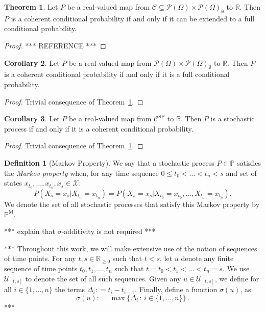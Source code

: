 \documentclass[10pt]{paper}
\theoremstyle{definition}
\newtheorem{theorem}{Theorem}
\newtheorem{corollary}[theorem]{Corollary}
\newtheorem{definition}{Definition}
\newcommand{\reals}{\mathbb{R}}
\newcommand{\realsnonneg}{\reals_{\geq 0}}
\newcommand{\states}{\mathcal{X}}
\newcommand{\paths}{\Omega}
\newcommand{\power}{\mathcal{P}(\paths)}
\newcommand{\nonemptypower}{\power_{\emptyset}}
\newcommand{\processes}{\mathbb{P}}
\newcommand{\mprocesses}{\processes^{\mathrm{M}}}
\newcommand{\coloneqq}{:\!=}
\begin{document}
\begin{theorem}\label{theo:coherentextendable}
Let $P$ be a real-valued map from $\mathcal{C}\subseteq\power\times\nonemptypower$ to $\reals$. Then $P$ is a coherent conditional probability if and only if it can be extended to a full conditional probability.
\end{theorem}
\begin{proof}
*** REFERENCE ***
\end{proof}

\begin{corollary}
Let $P$ be a real-valued map from $\power\times\nonemptypower$ to $\reals$. Then $P$ is a coherent conditional probability if and only if it is a full conditional probability.
\end{corollary}
\begin{proof}
Trivial consequence of Theorem~\ref{theo:coherentextendable}.
\end{proof}

\begin{corollary}
Let $P$ be a real-valued map from $\mathcal{C}^\mathrm{SP}$ to $\reals$. Then $P$ is a stochastic process if and only if it is a coherent conditional probability.
\end{corollary}
\begin{proof}
Trivial consequence of Theorem~\ref{theo:coherentextendable}.
\end{proof}


\begin{definition}[Markov Property]\label{def:markov_property}
We say that a stochastic process $P\in\processes$ satisfies the \emph{Markov property} when, for any time sequence $0\leq t_0<\dots<t_{n}<s$ and set of states $x_{t_0},\dots,x_{t_n},x_s\in\states$:
\begin{equation*}
P(X_s=x_s\vert X_{t_n}=x_{t_n})=P(X_s=x_s\vert X_{t_0}=x_{t_0}, \dots, X_{t_n}=x_{t_n}).
\end{equation*}
We denote the set of all stochastic processes that satisfy this Markov property by $\mprocesses$.
\end{definition}


*** explain that $\sigma$-additivity is not required ***


*** Throughout this work, we will make extensive use of the notion of sequences of time points. For any $t,s\in\realsnonneg$ such that $t<s$, let $u$ denote any finite sequence of time points $t_0,t_1,\ldots,t_n$ such that $t=t_0 < t_1 <\ldots < t_n = s$. We use $\mathcal{U}_{[t,s]}$ to denote the set of all such sequences. 
Given any $u\in\mathcal{U}_{[t,s]}$, we define for all $i\in\{1,\ldots,n\}$ the terms $\Delta_i\coloneqq t_i-t_{i-1}$.  Finally, define a function $\sigma(u)$, as
\begin{equation*}
\sigma(u) \coloneqq \max\bigl\{\Delta_i\,:\,i\in\{1,\ldots,n\}\bigr\}\,.
\end{equation*}
***
\end{document}
